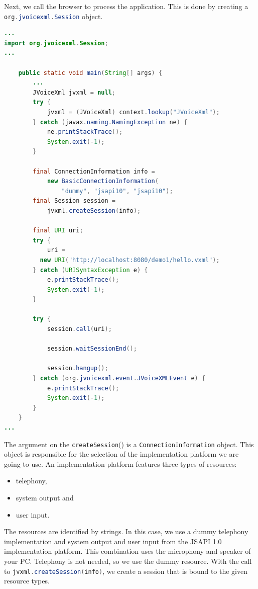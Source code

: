 \documentclass[11pt,a4paper]{book}
\begin{document}
Next, we call the browser to process the application. This is done
by creating a \lstinline[language=Java]{org.jvoicexml.Session} object.

\begin{lstlisting}[language=Java]
...
import org.jvoicexml.Session;
...

    public static void main(String[] args) {
        ...
        JVoiceXml jvxml = null;
        try {
            jvxml = (JVoiceXml) context.lookup("JVoiceXml");
        } catch (javax.naming.NamingException ne) {
            ne.printStackTrace();
            System.exit(-1);
        }

        final ConnectionInformation info =
            new BasicConnectionInformation(
                "dummy", "jsapi10", "jsapi10");
        final Session session = 
            jvxml.createSession(info);

        final URI uri;
        try {
            uri = 
          new URI("http://localhost:8080/demo1/hello.vxml");
        } catch (URISyntaxException e) {
            e.printStackTrace();
            System.exit(-1);
        }

        try {
            session.call(uri);

            session.waitSessionEnd();

            session.hangup();
        } catch (org.jvoicexml.event.JVoiceXMLEvent e) {
            e.printStackTrace();
            System.exit(-1);
        }
    }
...
\end{lstlisting}

The argument on the \lstinline[language=Java]{createSession}() is a
\lstinline[language=Java]{ConnectionInformation} object. This object is
responsible for the selection of the implementation platform we are going to
use. An implementation platform features three types of resources:
\begin{itemize}
  \item telephony,
  \item system output and
  \item user input.
\end{itemize}
The resources are identified by strings. In this case, we use a dummy telephony
implementation and system output and user input from the JSAPI 1.0
implementation platform. This combination uses the microphony and speaker of
your PC. Telephony is not needed, so we use the dummy resource. With the call to
\lstinline[language=Java]{jvxml.createSession(info)}, we create a session that
is bound to the given resource types.
\end{document}
